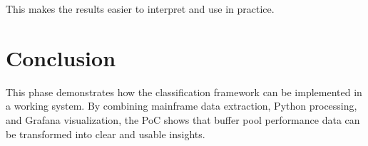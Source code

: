 This makes the results easier to interpret and use in practice.

\section{Conclusion}

This phase demonstrates how the classification framework can be implemented in a working system. By combining mainframe data extraction, Python processing, and Grafana visualization, the PoC shows that buffer pool performance data can be transformed into clear and usable insights.